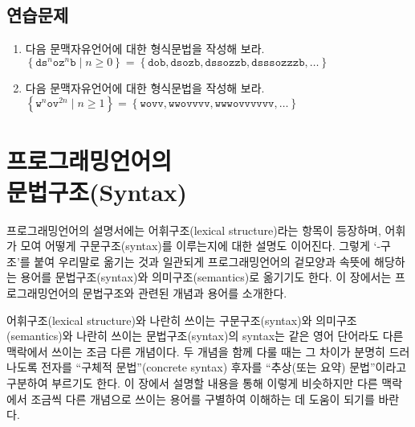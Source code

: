 \section*{연습문제}
\begin{enumerate}
\item 다음 문맥자유언어에 대한 형식문법을 작성해 보라.\\
$\displaystyle
 \left\{ \mathtt{d}\mathtt{s}^n\mathtt{o}\mathtt{z}^n\mathtt{b}
           \mid
           n\ge0 \right\}
 =
 \left\{ \mathtt{dob}
       , \mathtt{dsozb}
       , \mathtt{dssozzb}
       , \mathtt{dsssozzzb}
       , \ldots \right\}$

\item 다음 문맥자유언어에 대한 형식문법을 작성해 보라.\\
$\displaystyle
 \left\{ \mathtt{w}^n\mathtt{o}\mathtt{v}^{2n}
           \mid
           n\ge1 \right\}
 =
 \left\{ \mathtt{wovv}
       , \mathtt{wwovvvv}
       , \mathtt{wwwovvvvvv}
       , \ldots \right\}$
\end{enumerate}

\chapter[프로그래밍언어의 문법구조(Syntax)]{프로그래밍언어의\\문법구조(Syntax)}
프로그래밍언어의 설명서에는 어휘구조(lexical structure)라는 항목이
등장하며, 어휘가 모여 어떻게 구문구조(syntax)를 이루는지에 대한
설명도 이어진다. 그렇게 `-구조'를 붙여 우리말로 옮기는 것과 일관되게
프로그래밍언어의 겉모양과 속뜻에 해당하는 용어를
%
%
문법구조(syntax)와
%
%
의미구조(semantics)로 옮기기도 한다. 이 장에서는 프로그래밍언어의
문법구조와 관련된 개념과 용어를 소개한다.

어휘구조(lexical structure)와 나란히 쓰이는 구문구조(syntax)와
의미구조(semantics)와 나란히 쓰이는 문법구조(syntax)의
syntax는 같은 영어 단어라도 다른 맥락에서 쓰이는 조금 다른 개념이다.
두 개념을 함께 다룰 때는 그 차이가 분명히 드러나도록
전자를 ``구체적 문법''(concrete syntax) 후자를
``추상(또는 요약) 문법''이라고 구분하여 부르기도 한다.
이 장에서 설명할 내용을 통해 이렇게 비슷하지만 다른 맥락에서
조금씩 다른 개념으로 쓰이는 용어를 구별하여 이해하는 데 도움이
되기를 바란다.

\newpage

